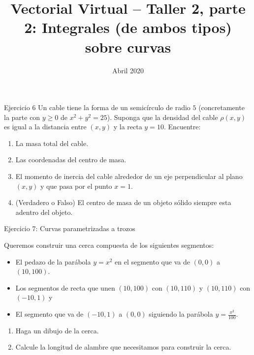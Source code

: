 \documentclass[usepdftitle=false]{beamer}
\title[]{Vectorial Virtual -- Taller 2, parte 2: Integrales (de ambos tipos) sobre curvas}
\date{Abril 2020}
\begin{document}
\begin{frame}
  \titlepage
\end{frame}

\begin{frame}{Ejercicio 6}
Un cable tiene la forma de un semic\'irculo de radio $5$ (concretamente la parte con $y\geq 0$ de $x^2+y^2=25$). Suponga que la densidad del cable $\rho(x,y)$ es igual a la distancia entre $(x,y)$ y la recta $y=10$. Encuentre:

\begin{enumerate}
\item La masa total del cable.
\item Las coordenadas del centro de masa.
\item El momento de inercia del cable alrededor de un eje perpendicular al plano $(x,y)$ y que pasa por el punto $x=1$.
\item (Verdadero o Falso) El centro de masa de un objeto s\'olido siempre esta adentro del objeto.

\end{enumerate}

\end{frame}

\begin{frame}{Ejercicio 7: Curvas parametrizadas a trozos}

Queremos construir una cerca compuesta de los siguientes segmentos: 

\begin{itemize}
\item El pedazo de la par\'abola $y=x^2$ en el segmento que va de $(0,0)$ a $(10,100)$.
\item Los segmentos de recta que unen  $(10,100)$ con $(10,110)$ y $(10,110)$ con $(-10,1)$ y
\item El segmento que va de $(-10,1)$ a $(0,0)$ siguiendo la par\'abola $y=\frac{x^2}{100}$.
\end{itemize}

\begin{enumerate}
\item Haga un dibujo de la cerca.
\item Calcule la longitud de alambre que necesitamos para construir la cerca.
\end{enumerate}



\end{frame}
\end{document}
